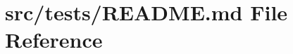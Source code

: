 \hypertarget{src_2tests_2README_8md}{}\section{src/tests/\+R\+E\+A\+D\+ME.md File Reference}
\label{src_2tests_2README_8md}
